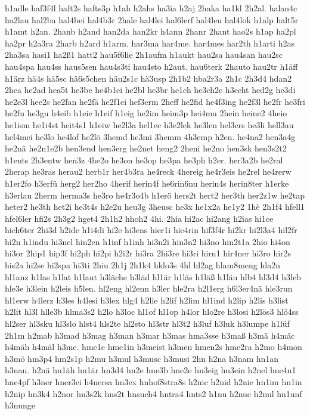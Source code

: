 {h1adle
haf3f4l
haft2s
hafts3p
h1ah
h2ahs
ha3ia
h2aj
2haka
ha1kl
2h2al.
halan4c
ha2lau
hal2ba
hal4bei
hal4b3r
2hale
hal4lei
hal6lerf
hal4leu
hal4lok
h1alp
halt5r
h1amt
h2an.
2hanb
h2and
han2da
han2kr
h4ann
2hanr
2hant
hao2s
h1ap
ha2pl
ha2pr
h2a3ra
2harb
h2ard
h1arm.
har3ma
har4me.
har4mes
har2th
h1arti
h2as
2ha3sa
hasi1
ha2ß1
hatt2
hau5f6lie
2h1aufm
h1aukt
hau2sa
hau4san
hau2sc
hau4spa
hau4ss
haus5sen
hau4s3ti
hau4sto
h2aut.
hau6terk
2hauto
hau2tr
h1äff
h1ärz
hä4s
hä5sc
hä6s5chen
häu2s1c
hä3usp
2h1b2
hba2r3a
2h1c
2h3d4
hdan2
2hea
he2ad
hea5t
he3be
he4b1ei
he2bl
he3br
he1ch
he3ch2e
h3echt
hed2g
he3di
he2e3l
hee2s
he2fan
he2fä
he2f1ei
hef3erm
2heff
he2fid
he4f3ing
he2f3l
he2fr
he3fri
he2fu
he3gu
h4eib
h1eie
h1eif
h1eig
he2im
heim3p
hei4mu
2hein
heine2
4heio
he1ism
he1i4st
heit4s1
h1eiw
he2l3a
hel1ec
h3e2lek
he3len
hel3ers
he3li
hell3au
hel4mei
he3lo
he4lof
he2lö
3hemd
he3mi
3hemm
4h3emp
h2en.
he4na2
hen3a4g
he2nä
he2n1e2b
hen3end
hen3erg
he2net
heng2
2heni
he2no
hen3sk
hen3s2t2
h1ents
2h3entw
hen3z
4he2o
he3on
he3op
he3pa
he3ph
h2er.
her3a2b
he2ral
2herap
he3ras
herau2
herb1r
her4b3ra
he4reck
4hereig
he4r3eis
he2rel
he4rerw
h1er2fo
h3erfü
herg2
her2ho
4herif
herin4f
he6rin6nu
herin4s
herin8ter
h1erke
h3erlau
2herm
herma3s
he3ro
he4r3o4b
h1erö
hers2t
hert2
her3th
her2z1w
he2tap
heter2
he3th
het2i
he3t4s
h2e2u
heu3g
3heusc
he3x
he1x2a
he1y2
1hè
2h1f4
hfell1
hfel6ler
hfi2s
2h3g2
hget4
2h1h2
hhoh2
4hi.
2hia
hi2ac
hi2ang
h2ias
hi1ce
hich6ter
2hi3d
h2ide
h1i4di
hi2e
hi3ens
hier1i
hie4rin
hif3f4r
hi2kr
hi2l3a4
hil2fr
hi2n
h1indu
hi3nel
hin2en
h1inf
h1inh
hi3n2i
hin3n2
hi3no
hin2t1a
2hio
hi4on
hi3or
2hip1
hip3f
hi2ph
hi2pi
h2i2r
hi3ra
2hi3re
hi3ri
hirn1
hir4ner
hi3ro
hir2s
his2a
hi2se
hi2spa
hi3ti
2hiu
2h1j
2h1k4
hklo3s
4hl
hl2ag
hlam8meng
hla2n
hl1anz
h1las
h1lat
h1laut
h3läche
h3läd
hl1är
h1läs
h1läß
h1läu
hlb4
hl3d4
h3leb
hle3e
h3lein
h2leis
h5len.
hl2eng
hl2enn
h3ler
hle2ra
h2l1erg
h6l3er4nä
hle3run
hl1erw
h4lerz
h3les
h4lesi
h3lex
hlg4
h2lie
h2lif
h2lim
hl1ind
h2lip
h2lis
h3list
h2lit
hl3l
hlle3b
hlma3s2
h2lo
h3loc
hl1of
hl1op
h4lor
hlo2re
h3losi
h2lös3
hlö4ss
hl2ser
hl3sku
hl3slo
hlst4
hls2te
hl2sto
hl3str
hl3t2
h3luf
h3luk
h3lumpe
h1lüf
2h1m
h2mab
h3mad
h3mag
h3man
h3mar
h3mas
hma3sse
h3maß
h3mä
h4mäc
h4mäh
h4mäl
h3me.
hme1e
hme1in
h3meist
h3men
hmen2s
hme2ra
h2mo
h4mon
h3mö
hm3p4
hm2s1p
h2mu
h3mul
h3musc
h3musi
2hn
h2na
h3nam
hn1an
h3nau.
h2nä
hn1äh
hn1är
hn3d4
hn2e
hne3b
hne2e
hn3eig
hn3ein
h2nel
hne4n1
hne4pf
h3ner
hner3ei
h4nersa
hn3ex
hnhof8stra8s
h2nic
h2nid
h2nie
hn1im
hn1in
h2nip
hn3k4
h2nor
hn3s2k
hns2t
hnsuch4
hntra4
hnts2
h1nu
h2nuc
h2nul
hn1unf
h3nunge
}
